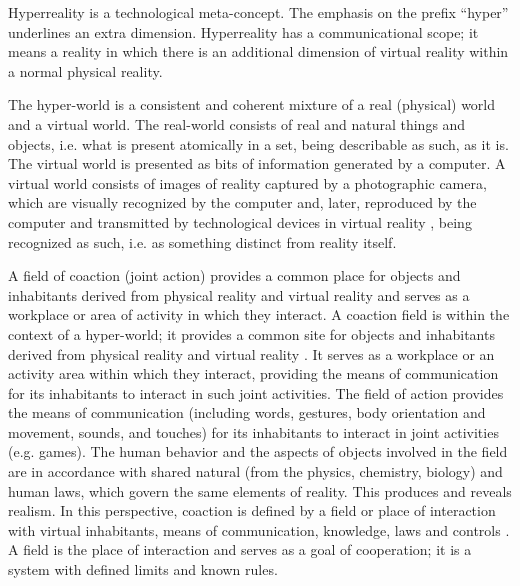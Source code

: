 \documentclass[english]{textolivre}
\begin{document}
Hyperreality is a technological meta-concept. The emphasis on the prefix “hyper” underlines an extra dimension. Hyperreality has a communicational scope; it means a reality in which there is an additional dimension of virtual reality within a normal physical reality.

The hyper-world is a consistent and coherent mixture of a real (physical) world and a virtual world. The real-world consists of real and natural things and objects, i.e. what is present atomically in a set, being describable as such, as it is. The virtual world is presented as bits of information generated by a computer. A virtual world consists of images of reality captured by a photographic camera, which are visually recognized by the computer and, later, reproduced by the computer and transmitted by technological devices in virtual reality \cite[p.~8]{terashima_definition_2005}, being recognized as such, i.e. as something distinct from reality itself.

A field of coaction (joint action) provides a common place for objects and inhabitants derived from physical reality and virtual reality and serves as a workplace or area of activity in which they interact. A coaction field is within the context of a hyper-world; it provides a common site for objects and inhabitants derived from physical reality and virtual reality \cite[p.~9]{terashima_definition_2005}. It serves as a workplace or an activity area within which they interact, providing the means of communication for its inhabitants to interact in such joint activities. The field of action provides the means of communication (including words, gestures, body orientation and movement, sounds, and touches) for its inhabitants to interact in joint activities (e.g. games). The human behavior and the aspects of objects involved in the field are in accordance with shared natural (from the physics, chemistry, biology) and human laws, which govern the same elements of reality. This produces and reveals realism. In this perspective, coaction is defined by a field or place of interaction with virtual inhabitants, means of communication, knowledge, laws and controls \cite[p.~9]{terashima_definition_2005}. A field is the place of interaction and serves as a goal of cooperation; it is a system with defined limits and known rules.
\end{document}
